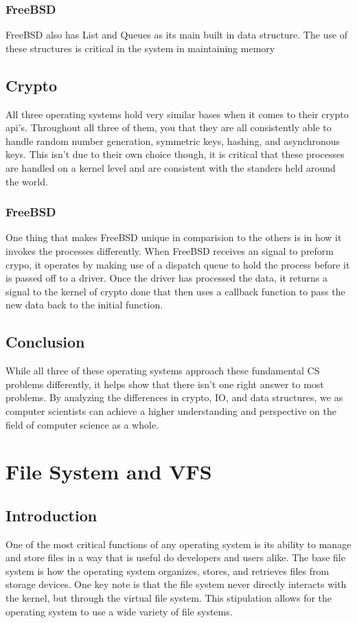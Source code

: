\documentclass[draftclsnofoot, onecolumn] {report}
\begin{document}
\subsection{FreeBSD}
FreeBSD also has List and Queues as its main built in data structure.
The use of these structures is critical in the system in maintaining memory

\section{Crypto}
All three operating systems hold very similar bases when it comes to their crypto api's.
Throughout all three of them, you that they are all consistently able to handle random number generation, symmetric keys, hashing, and asynchronous keys.
This isn't due to their own choice though, it is critical that these processes are handled on a kernel level and are consistent with the standers held around the world.

\subsection{FreeBSD}
One thing that makes FreeBSD unique in comparision to the others is in how it  invokes the processes differently. 
When FreeBSD receives an signal to preform crypo, it  operates by making use of a dispatch queue to hold the process before it is passed off to a driver.
Once the driver has processed the data, it returns a signal to the kernel of crypto done that then uses a callback function to pass the new data back to the initial function.

\section{Conclusion}
While all three of these operating systems approach these fundamental CS problems differently, it helps show that there isn't one right answer to most problems. 
By analyzing the differences in crypto, IO, and data structures, we as computer scientists can achieve a higher understanding and perspective on the field of computer science as a whole. 

\chapter{File System and VFS}

\section{Introduction}
One of the most critical functions of any operating system is its ability to manage and store files in a way that is useful do developers and users alike.
The base file system is how the operating system organizes, stores, and retrieves files from storage devices. 
One key note is that the file system never directly interacts with the kernel, but through the virtual file system.
This stipulation allows for the operating system to use a wide variety of file systems.
\end{document}
